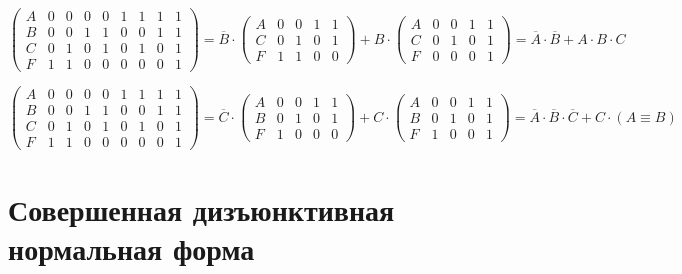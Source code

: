 \documentclass[a4paper,10pt]{article} %
\begin{document}
	\begin{equation}
		\left(
		\begin{smallmatrix}
			A & 0 & 0 & 0 & 0 & 1 & 1 & 1 & 1 \\
			B & 0 & 0 & 1 & 1 & 0 & 0 & 1 & 1 \\
			C & 0 & 1 & 0 & 1 & 0 & 1 & 0 & 1 \\
			F & 1 & 1 & 0 & 0 & 0 & 0 & 0 & 1
		\end{smallmatrix}
		\right)
		= \overline{B} \cdot
		\left(
		\begin{smallmatrix}
			A & 0 & 0 & 1 & 1 \\
			C & 0 & 1 & 0 & 1 \\
			F & 1 & 1 & 0 & 0 
		\end{smallmatrix}
		\right)
		+ B \cdot
		\left(
		\begin{smallmatrix}
			A & 0 & 0 & 1 & 1 \\
			C & 0 & 1 & 0 & 1 \\
			F & 0 & 0 & 0 & 1
		\end{smallmatrix}
		\right)
		= \overline{A} \cdot \overline{B} + A \cdot B \cdot C
	\end{equation}

	\begin{equation}
		\left(
		\begin{smallmatrix}
			A & 0 & 0 & 0 & 0 & 1 & 1 & 1 & 1 \\
			B & 0 & 0 & 1 & 1 & 0 & 0 & 1 & 1 \\
			C & 0 & 1 & 0 & 1 & 0 & 1 & 0 & 1 \\
			F & 1 & 1 & 0 & 0 & 0 & 0 & 0 & 1
		\end{smallmatrix}
		\right)
		= \overline{C} \cdot 
		\left(
		\begin{smallmatrix}
			A & 0 & 0 & 1 & 1 \\
			B & 0 & 1 & 0 & 1 \\
			F & 1 & 0 & 0 & 0
		\end{smallmatrix}
		\right)
		+ C \cdot
		\left(
		\begin{smallmatrix}
			A & 0 & 0 & 1 & 1 \\
			B & 0 & 1 & 0 & 1 \\
			F & 1 & 0 & 0 & 1
		\end{smallmatrix}
		\right)
		= \overline{A} \cdot \overline{B} \cdot \overline{C} + C \cdot (A \equiv B) 
	\end{equation}
	
	\section{Совершенная дизъюнктивная нормальная форма}
	
\end{document}
